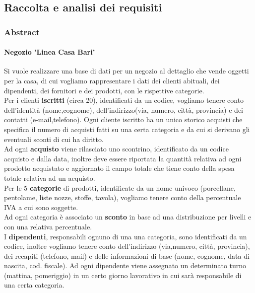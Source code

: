 \subsection{Raccolta e analisi dei requisiti}
\subsubsection{Abstract}
\paragraph*{Negozio 'Linea Casa Bari'}
Si vuole realizzare una base di dati per un negozio al dettaglio che vende oggetti per la casa, di cui vogliamo rappresentare i dati dei clienti abituali, dei dipendenti, dei fornitori e dei prodotti, con le rispettive categorie. \\

Per i clienti \textbf{iscritti} (circa 20), identificati da un codice, vogliamo tenere conto dell'identit\`a (nome,cognome), dell'indirizzo(via, numero, citt\`a, provincia) e dei contatti (e-mail,telefono). Ogni cliente iscritto ha un unico storico acquisti che specifica il numero di acquisti fatti su una certa categoria e da cui si derivano gli eventuali sconti di cui ha diritto. \\

Ad ogni \textbf{acquisto} viene rilasciato uno scontrino, identificato da un codice acquisto e dalla data, inoltre deve essere riportata la quantit\`a relativa ad ogni prodotto acquistato e aggiornato il campo totale che tiene conto della spesa totale relativa ad un acquisto. \\

Per le 5 \textbf{categorie} di prodotti, identificate da un nome univoco (porcellane, pentolame, liste nozze, stoffe, tavola), vogliamo tenere conto della percentuale IVA a cui sono soggette. \\

Ad ogni categoria \`e associato un \textbf{sconto} in base ad una distribuzione per livelli e con una relativa percentuale. \\

I \textbf{dipendenti}, responsabili ognuno di una una categoria, sono identificati da un codice, inoltre vogliamo tenere conto dell'indirizzo (via,numero, citt\`a, provincia), dei recapiti (telefono, mail) e delle informazioni di base (nome, cognome, data di nascita, cod. fiscale). Ad ogni dipendente viene assegnato un determinato turno (mattina, pomeriggio) in un certo giorno lavorativo in cui sar\`a responsabile di una certa categoria. \\


